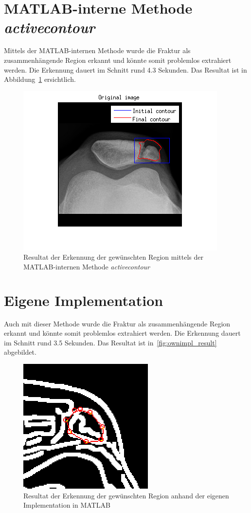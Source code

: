 \section{MATLAB-interne Methode \textit{activecontour}}
\label{sec:results:matlab}
Mittels der MATLAB-internen Methode wurde die Fraktur als zusammenhängende Region erkannt und könnte somit problemlos extrahiert werden. Die Erkennung dauert im Schnitt rund 4.3 Sekunden. Das Resultat ist in Abbildung~\ref{fig:matlab_result} ersichtlich.

\begin{figure}[h!]
    \centering
    \includegraphics[scale=0.6]{images/matlab_result.png}
    \caption{Resultat der Erkennung der gewünschten Region mittels der MATLAB-internen Methode \textit{activecontour}\protect\footnotemark[1]{}}
\label{fig:matlab_result}
\end{figure}

\section{Eigene Implementation}
\label{sec:results:own}
Auch mit dieser Methode wurde die Fraktur als zusammenhängende Region erkannt und könnte somit problemlos extrahiert werden. Die Erkennung dauert im Schnitt rund 3.5 Sekunden. Das Resultat ist in~\autoref{fig:ownimpl_result} abgebildet.

\begin{figure}[h!]
    \centering
    \includegraphics[scale=0.6]{images/ownimpl_result.png}
    \caption{Resultat der Erkennung der gewünschten Region anhand der eigenen Implementation in MATLAB\protect\footnotemark[1]{}}
\label{fig:ownimpl_result}
\end{figure}
